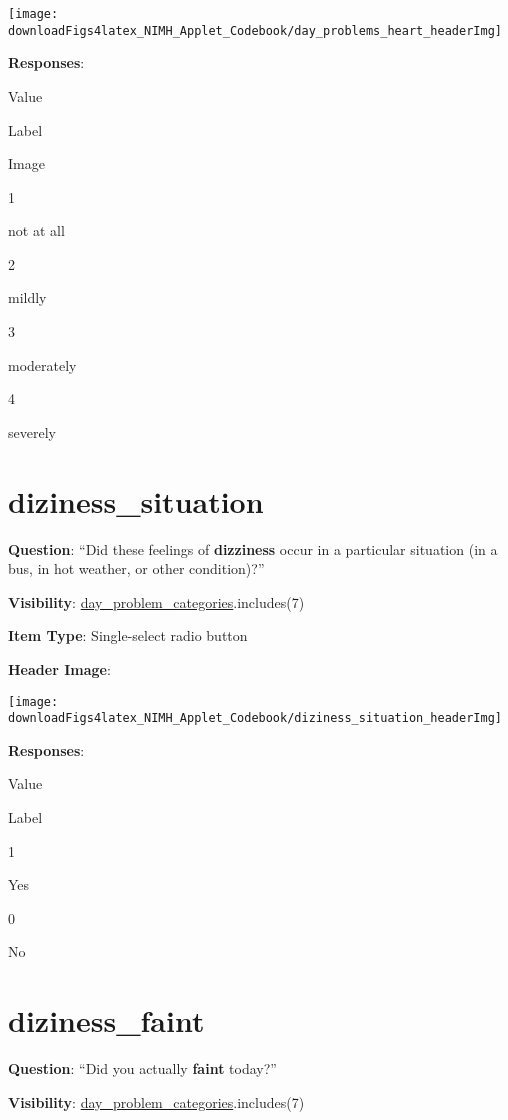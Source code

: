 \documentclass[]{book}
\begin{document}
\begin{flushleft}\texttt{[image: downloadFigs4latex\_NIMH\_Applet\_Codebook/day\_problems\_heart\_headerImg]} \end{flushleft}

\textbf{Responses}:

Value

Label

Image

1

not at all

2

mildly

3

moderately

4

severely

\hypertarget{diziness_situation}{%
\section{diziness\_situation}\label{diziness_situation}}

\textbf{Question}: ``Did these feelings of \textbf{dizziness} occur in a particular situation (in a bus, in hot weather, or other condition)?''

\textbf{Visibility}: \protect\hyperlink{day_problem_categories}{day\_problem\_categories}.includes(7)

\textbf{Item Type}: Single-select radio button

\textbf{Header Image}:

\begin{flushleft}\texttt{[image: downloadFigs4latex\_NIMH\_Applet\_Codebook/diziness\_situation\_headerImg]} \end{flushleft}

\textbf{Responses}:

Value

Label

1

Yes

0

No

\hypertarget{diziness_faint}{%
\section{diziness\_faint}\label{diziness_faint}}

\textbf{Question}: ``Did you actually \textbf{faint} today?''

\textbf{Visibility}: \protect\hyperlink{day_problem_categories}{day\_problem\_categories}.includes(7)
\end{document}
